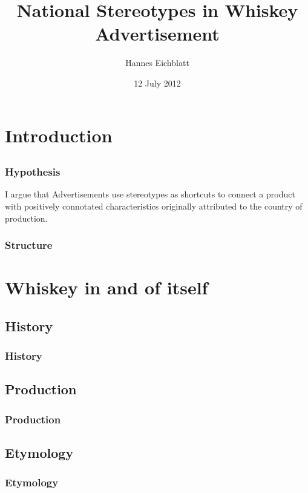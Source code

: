 \documentclass{beamer}
\title{National Stereotypes in Whiskey Advertisement}
\institute{Institut für Anglistik\\Universität Leipzig}
\author{Hannes Eichblatt}
\date{12 July 2012}
\begin{document}
\frame[plain]{\maketitle}

\section{Introduction}
\subsection{}

\begin{frame}
 \frametitle{Hypothesis}
 \begin{block}{I argue that}
  Advertisements use stereotypes as shortcuts to connect a product with positively connotated characteristics originally attributed to the country of production.
 \end{block}
\end{frame}

\begin{frame}
 \frametitle{Structure}
 \tableofcontents[]
\end{frame}

\section{Whiskey in and of itself}
\subsection{History}

\begin{frame}
 \frametitle{History}
\end{frame}

\subsection{Production}

\begin{frame}
 \frametitle{Production}
\end{frame}

\subsection{Etymology}

\begin{frame}
 \frametitle{Etymology}
\end{frame}
  
\end{document}
